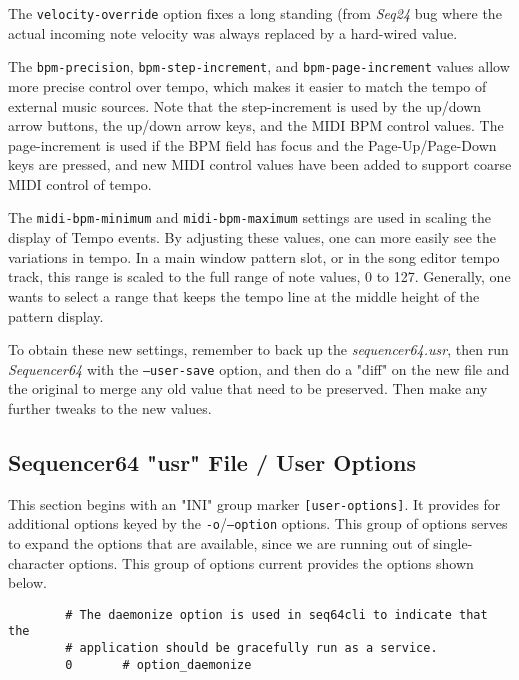       The \texttt{velocity-override} option fixes a long standing (from
      \textsl{Seq24} bug where the actual incoming note velocity was always
      replaced by a hard-wired value.

      The \texttt{bpm-precision}, \texttt{bpm-step-increment}, and
      \texttt{bpm-page-increment} values allow more precise control over tempo,
      which makes it easier to match the tempo of external music sources.  Note
      that the step-increment is used by the up/down arrow buttons, the up/down
      arrow keys, and the MIDI BPM control values.  The page-increment is used
      if the BPM field has focus and the Page-Up/Page-Down keys are pressed,
      and new MIDI control values have been added to support coarse MIDI
      control of tempo.

		The \texttt{midi-bpm-minimum} and \texttt{midi-bpm-maximum} settings
		are used in scaling the display of Tempo events.
      By adjusting these values, one can more easily see the variations in
      tempo.  In a main window pattern slot, or in the song editor tempo track,
      this range is scaled to the full range of note values, 0 to 127.
      Generally, one wants to select a range that keeps the tempo line at the
      middle height of the pattern display.

   To obtain these new settings, remember to back up the
   \textsl{sequencer64.usr}, then run \textsl{Sequencer64} with the
   \texttt{--user-save} option, and then do a "diff" on the new file and the
   original to merge any old value that need to be preserved.  Then make any
   further tweaks to the new values.

\subsection{Sequencer64 "usr" File / User Options}
\label{subsec:seq64_usr_file_user_options}

   This section begins with an
   "INI" group marker \texttt{[user-options]}.
   It provides for additional options keyed by the
   \texttt{-o}/\texttt{--option} options.
   This group of options serves to expand the options that are available, since
   we are running out of single-character options.
   This group of options current provides the options shown below.

   \begin{verbatim}
		# The daemonize option is used in seq64cli to indicate that the
		# application should be gracefully run as a service.
		0       # option_daemonize
   \end{verbatim}

